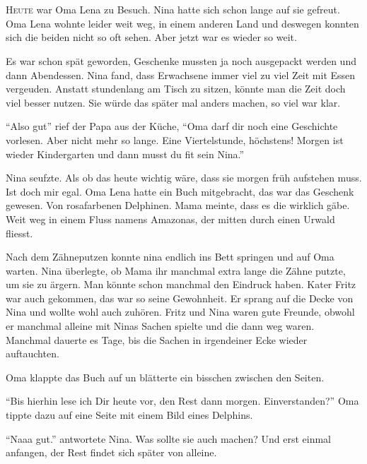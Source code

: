 \chapter*{}
\begin{mdframed}[style=mystyle]
\lettrine[lines=3]{\color{red}H}{eute} war Oma Lena zu Besuch. Nina hatte sich schon lange auf sie gefreut. Oma Lena wohnte leider weit weg, in einem anderen Land und deswegen konnten sich die beiden nicht so oft sehen. Aber jetzt war es wieder so weit. 

Es war schon spät geworden, Geschenke mussten ja noch ausgepackt werden und dann Abendessen. Nina fand, dass Erwachsene immer viel zu viel Zeit mit Essen vergeuden. Anstatt stundenlang am Tisch zu sitzen, könnte man die Zeit doch viel besser nutzen. Sie würde das später mal anders machen, so viel war klar.

\enquote{Also gut} rief der Papa aus der Küche, \enquote{Oma darf dir noch eine Geschichte vorlesen. Aber nicht mehr so lange. Eine Viertelstunde, höchstens! Morgen ist wieder Kindergarten und dann musst du fit sein Nina.}

Nina seufzte. Als ob das heute wichtig wäre, dass sie morgen früh aufstehen muss. Ist doch mir egal. Oma Lena hatte ein Buch mitgebracht, das war das Geschenk gewesen. Von rosafarbenen Delphinen. Mama meinte, dass es die wirklich gäbe. Weit weg in einem Fluss namens Amazonas, der mitten durch einen Urwald fliesst. 

Nach dem Zähneputzen konnte nina endlich ins Bett springen und auf Oma warten. Nina überlegte, ob Mama ihr manchmal extra lange die Zähne putzte, um sie zu ärgern. Man könnte schon manchmal den Eindruck haben. Kater Fritz war auch gekommen, das war so seine Gewohnheit. Er sprang auf die Decke von Nina und wollte wohl auch zuhören. Fritz und Nina waren gute Freunde, obwohl er manchmal alleine mit Ninas Sachen spielte und die dann weg waren. Manchmal dauerte es Tage, bis die Sachen in irgendeiner Ecke wieder auftauchten. 

Oma klappte das Buch auf un blätterte ein bisschen zwischen den Seiten.

\enquote{Bis hierhin lese ich Dir heute vor, den Rest dann morgen. Einverstanden?} Oma tippte dazu auf eine Seite mit einem Bild eines Delphins. 

\enquote{Naaa gut.} antwortete Nina. Was sollte sie auch machen? Und erst einmal anfangen, der Rest findet sich später von alleine.
\end{mdframed}\medskip

